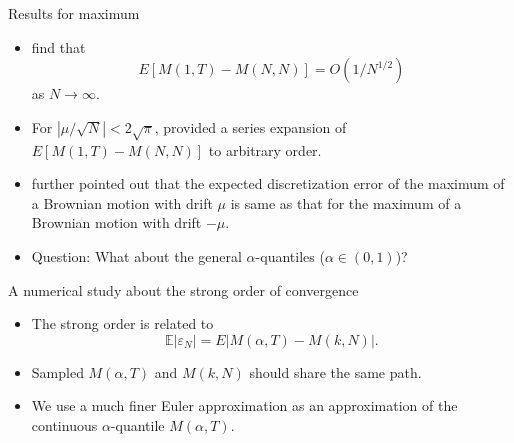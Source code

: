 \documentclass[cjk,10pt]{beamer}
\begin{document}
\begin{frame}{Results for maximum}
\begin{itemize}
\item
\cite{A-G-P-1995} find that \[E[M(1,T)-M(N,N)] = O(1/N^{1/2})\] as $N\to\infty$. 
\item
For $|\mu /\sqrt{N}|<2\sqrt{\pi}$, \cite{Janssen2008} provided a series expansion of $E[M(1,T) -M(N,N)]$ to arbitrary order.
\item
\cite{Janssen2008} further pointed out that the expected discretization error of the maximum of a Brownian motion with drift $\mu$ is same as that for the maximum of a Brownian motion with drift $-\mu$.  
\item
{\color{red} Question:} What about the general $\alpha$-quantiles ($\alpha \in (0,1)$)? 
\end{itemize}
\end{frame}

\begin{frame}{A numerical study about the strong order of convergence}
\begin{itemize}
\item
The strong order is related to 
\begin{equation}\label{strong-g}
\mathbb E|\varepsilon_N| =E|M(\alpha, T)-M(k,N)|.
\end{equation}
\item
Sampled $M(\alpha,T)$ and $M(k,N)$ should share the same path. 
\item
We use a much finer Euler approximation as an approximation of the continuous $\alpha$-quantile $M(\alpha, T)$. 
\end{itemize}
\end{frame}
\end{document}
